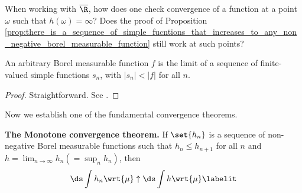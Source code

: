 \documentclass{article} %
\begin{document}
\begin{question}
When working with $\overline{\R}$, how does one check convergence of a function at a point $\omega$ such that $h(\omega)=\infty$?  Does the proof of Proposition \ref{prop:there_is_a_sequence_of_simple_fucntions_that_increases_to_any_non_negative_borel_measurable_function} still work at such points?
\end{question}

\begin{corollary}{}
An arbitrary Borel measurable function $f$ is the limit of a sequence of finite-valued simple functions $s_n$, with $|s_n|<|f|$ for all $n$.
\label{cor:measurable_function_is_limit_of_simple_functions_which_it_dominates}
\end{corollary}

\begin{proof}
Straightforward. See \cite[Theorem 1.5.5b]{ash2000probability}.	
\end{proof}


Now we establish one of the fundamental convergence theorems. 

\begin{theorem}{\textbf{The Monotone convergence theorem.}}
If $\set{h_n}$ is a sequence of non-negative Borel measurable functions such that $h_n \leq h_{n+1}$ for all $n$ and $h =\lim_{n \to \infty} h_n (= \sup_n h_n)$, then 
\begin{align*}
\ds \int h_n \wrt{\mu} \uparrow \ds\int h \wrt{\mu}
\labelit \label{eqn:monotone_convergence_theorem_conclusion}	
\end{align*}
\label{thm:monotone_convergence_theorem}
\end{theorem}
\end{document}
